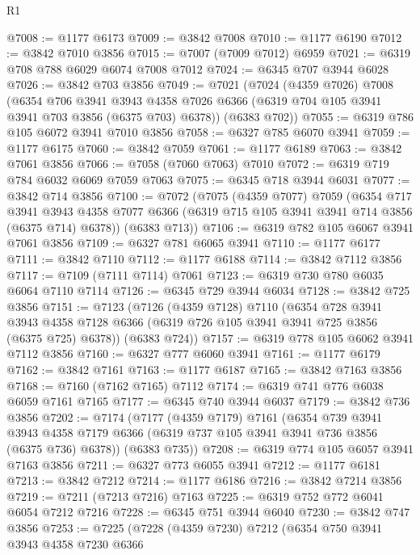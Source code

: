 \begin{lexlean}{R1}
\begin{coremodule}
@7008 := @1177 @6173
@7009 := @3842 @7008
@7010 := @1177 @6190
@7012 := @3842 @7010 @3856
@7015 := @7007 (@7009 @7012) @6959
@7021 := @6319 @708 @788 @6029 @6074 @7008 @7012
@7024 := @6345 @707 @3944 @6028
@7026 := @3842 @703 @3856
@7049 := @7021
    (@7024
      (@4359 @7026)
      @7008
      (@6354
        @706
        @3941
        @3943
        @4358
        @7026
        @6366
        (@6319 @704 @105 @3941 @3941 @703 @3856 (@6375 @703) @6378))
      (@6383 @702))
@7055 := @6319 @786 @105 @6072 @3941 @7010 @3856
@7058 := @6327 @785 @6070 @3941
@7059 := @1177 @6175
@7060 := @3842 @7059
@7061 := @1177 @6189
@7063 := @3842 @7061 @3856
@7066 := @7058 (@7060 @7063) @7010
@7072 := @6319 @719 @784 @6032 @6069 @7059 @7063
@7075 := @6345 @718 @3944 @6031
@7077 := @3842 @714 @3856
@7100 := @7072
    (@7075
      (@4359 @7077)
      @7059
      (@6354
        @717
        @3941
        @3943
        @4358
        @7077
        @6366
        (@6319 @715 @105 @3941 @3941 @714 @3856 (@6375 @714) @6378))
      (@6383 @713))
@7106 := @6319 @782 @105 @6067 @3941 @7061 @3856
@7109 := @6327 @781 @6065 @3941
@7110 := @1177 @6177
@7111 := @3842 @7110
@7112 := @1177 @6188
@7114 := @3842 @7112 @3856
@7117 := @7109 (@7111 @7114) @7061
@7123 := @6319 @730 @780 @6035 @6064 @7110 @7114
@7126 := @6345 @729 @3944 @6034
@7128 := @3842 @725 @3856
@7151 := @7123
    (@7126
      (@4359 @7128)
      @7110
      (@6354
        @728
        @3941
        @3943
        @4358
        @7128
        @6366
        (@6319 @726 @105 @3941 @3941 @725 @3856 (@6375 @725) @6378))
      (@6383 @724))
@7157 := @6319 @778 @105 @6062 @3941 @7112 @3856
@7160 := @6327 @777 @6060 @3941
@7161 := @1177 @6179
@7162 := @3842 @7161
@7163 := @1177 @6187
@7165 := @3842 @7163 @3856
@7168 := @7160 (@7162 @7165) @7112
@7174 := @6319 @741 @776 @6038 @6059 @7161 @7165
@7177 := @6345 @740 @3944 @6037
@7179 := @3842 @736 @3856
@7202 := @7174
    (@7177
      (@4359 @7179)
      @7161
      (@6354
        @739
        @3941
        @3943
        @4358
        @7179
        @6366
        (@6319 @737 @105 @3941 @3941 @736 @3856 (@6375 @736) @6378))
      (@6383 @735))
@7208 := @6319 @774 @105 @6057 @3941 @7163 @3856
@7211 := @6327 @773 @6055 @3941
@7212 := @1177 @6181
@7213 := @3842 @7212
@7214 := @1177 @6186
@7216 := @3842 @7214 @3856
@7219 := @7211 (@7213 @7216) @7163
@7225 := @6319 @752 @772 @6041 @6054 @7212 @7216
@7228 := @6345 @751 @3944 @6040
@7230 := @3842 @747 @3856
@7253 := @7225
    (@7228
      (@4359 @7230)
      @7212
      (@6354
        @750
        @3941
        @3943
        @4358
        @7230
        @6366

\end{coremodule}
\end{lexlean}

